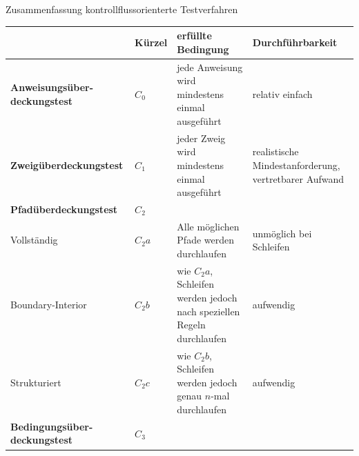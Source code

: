 \begin{bonus}{Zusammenfassung kontrollflussorienterte Testverfahren}
    \begin{tabularx}{\textwidth}{|p{4.1cm}|l|X|X|}
        \hline
                                              & \bfseries Kürzel & \bfseries erfüllte Bedingung                                                                                  & \bfseries Durchführbarkeit                            \\
        \hline
        \hline
        \bfseries Anweisungsüber-deckungstest & $C_0$            & jede Anweisung wird mindestens einmal ausgeführt                                                              & relativ einfach                                       \\
        \hline
        \hline
        \bfseries Zweigüberdeckungstest       & $C_1$            & jeder Zweig wird mindestens einmal ausgeführt                                                                 & realistische Mindestanforderung, vertretbarer Aufwand \\
        \hline
        \hline
        \bfseries Pfadüberdeckungstest        & $C_2$            &                                                                                                               &                                                       \\
        \hline
        Vollständig                           & $C_2a$           & Alle möglichen Pfade werden durchlaufen                                                                       & unmöglich bei Schleifen                               \\
        \hline
        Boundary-Interior                     & $C_2b$           & wie $C_2a$, Schleifen werden jedoch nach speziellen Regeln durchlaufen                                        & aufwendig                                             \\
        \hline
        Strukturiert                          & $C_2c$           & wie $C_2b$, Schleifen werden jedoch genau $n$-mal durchlaufen                                                 & aufwendig                                             \\
        \hline
        \hline
        \bfseries Bedingungsüber-deckungstest & $C_3$            &                                                                                                               &                                                       \\
        \hline

\end{tabularx}
\end{bonus}
